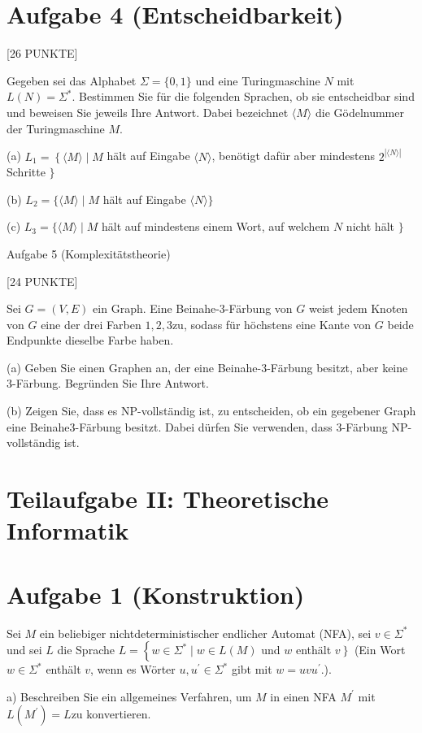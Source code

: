 \documentclass[10pt]{article}
\begin{document}
\section*{Aufgabe 4 (Entscheidbarkeit)}
[26 PUNKTE]

Gegeben sei das Alphabet $\Sigma=\{0,1\}$ und eine Turingmaschine $N$ mit $L(N)=\Sigma^{*}$. Bestimmen Sie für die folgenden Sprachen, ob sie entscheidbar sind und beweisen Sie jeweils Ihre Antwort. Dabei bezeichnet $\langle M\rangle$ die Gödelnummer der Turingmaschine $M$.

(a) $L_{1}=\left\{\langle M\rangle \mid M\right.$ hält auf Eingabe $\langle N\rangle$, benötigt dafür aber mindestens $2^{|\langle N\rangle|}$ Schritte $\}$

(b) $L_{2}=\{\langle M\rangle \mid M$ hält auf Eingabe $\langle N\rangle\}$

(c) $L_{3}=\{\langle M\rangle \mid M$ hält auf mindestens einem Wort, auf welchem $N$ nicht hält $\}$

Aufgabe 5 (Komplexitätstheorie)

[24 PUNKTE]

Sei $G=(V, E)$ ein Graph. Eine Beinahe-3-Färbung von $G$ weist jedem Knoten von $G$ eine der drei Farben $1,2,3 \mathrm{zu}$, sodass für höchstens eine Kante von $G$ beide Endpunkte dieselbe Farbe haben.

(a) Geben Sie einen Graphen an, der eine Beinahe-3-Färbung besitzt, aber keine 3-Färbung. Begründen Sie Ihre Antwort.

(b) Zeigen Sie, dass es NP-vollständig ist, zu entscheiden, ob ein gegebener Graph eine Beinahe3-Färbung besitzt. Dabei dürfen Sie verwenden, dass 3-Färbung NP-vollständig ist.

\section*{Teilaufgabe II: Theoretische Informatik}
\section*{Aufgabe 1 (Konstruktion)}
Sei $M$ ein beliebiger nichtdeterministischer endlicher Automat (NFA), sei $v \in \Sigma^{*}$ und sei $L$ die Sprache $L=\left\{w \in \Sigma^{*} \mid w \in L(M)\right.$ und $w$ enthält $\left.v\right\}$ (Ein Wort $w \in \Sigma^{*}$ enthält $v$, wenn es Wörter $u, u^{\prime} \in \Sigma^{*}$ gibt mit $w=u v u^{\prime}$.).

a) Beschreiben Sie ein allgemeines Verfahren, um $M$ in einen NFA $M^{\prime}$ mit $L\left(M^{\prime}\right)=L \mathrm{zu}$ konvertieren.
\end{document}
